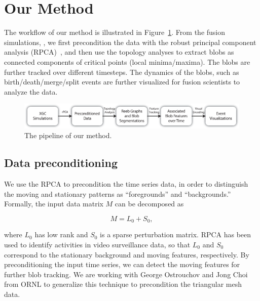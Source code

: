 \section{Our Method}
\label{sec:method}

The workflow of our method is illustrated in Figure~\ref{fig:pipeline}.  
From the fusion simulations, , we first precondition the data with the robust principal component analysis (RPCA)~\cite{CandesLMW11}, and then use the topology analyses to extract blobs as connected components of critical points (local minima/maxima).  The blobs are further tracked over different timesteps.  The dynamics of the blobs, such as birth/death/merge/split events are further visualized for fusion scientists to analyze the data.  



\begin{figure}[!h]
  \centering
  \includegraphics[width=\linewidth]{Figs/pipeline}
  \caption{The pipeline of our method.}
  \label{fig:pipeline}
\end{figure}


\subsection{Data preconditioning}

We use the RPCA to precondition the time series data, in order to distinguish the moving and stationary patterns as ``foregrounds'' and ``backgrounds.''  Formally, the input data matrix $M$ can be decomposed as 

\begin{equation}
M = L_0 + S_0, 
\end{equation}

\noindent where $L_0$ has low rank and $S_0$ is a sparse perturbation matrix.  RPCA has been used to identify activities in video surveillance data, so that $L_0$ and $S_0$ correspond to the stationary background and moving features, respectively.  By preconditioning the input time series, we can detect the moving features for further blob tracking.  We are working with George Ostrouchov and Jong Choi from ORNL to generalize this technique to precondition the triangular mesh data.  


